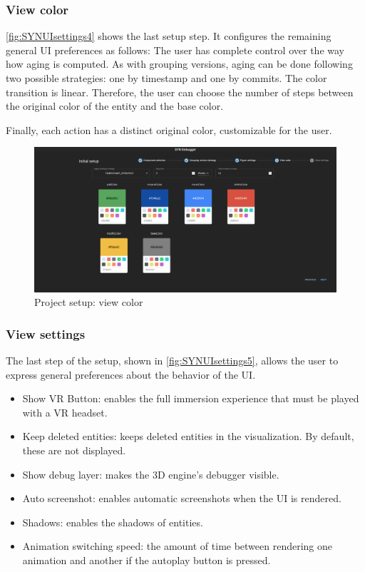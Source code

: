\subsubsection*{View color}

\autoref{fig:SYNUIsettings4} shows the last setup step. It configures the remaining general UI preferences as follows:
The user has complete control over the way how aging is computed. 
As with grouping versions, aging can be done following two possible strategies: one by timestamp and one by commits. 
The color transition is linear. Therefore, the user can choose the number of steps between the original color of the entity and the base color. 

Finally, each action has a distinct original color, customizable for the user.

\begin{figure}
    \center
    \includegraphics[width=\textwidth]{SYNUI-settings4.png}
    \caption{Project setup: view color}
    \label{fig:SYNUIsettings4}
\end{figure}

\subsubsection*{View settings}
The last step of the setup, shown in \autoref{fig:SYNUIsettings5}, allows the user to express general preferences about the behavior of the UI.

\begin{itemize}
    \item Show VR Button: enables the full immersion experience that must be played with a VR headset. 
    \item Keep deleted entities: keeps deleted entities in the visualization. By default, these are not displayed. 
    \item Show debug layer: makes the 3D engine's debugger visible. 
    \item Auto screenshot: enables automatic screenshots when the UI is rendered.
    \item Shadows: enables the shadows of entities. 
    \item Animation switching speed: the amount of time between rendering one animation and another if the autoplay button is pressed. 
\end{itemize}

